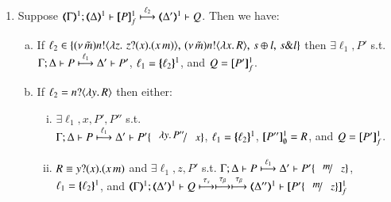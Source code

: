 \documentclass[runningheads]{llncs}
\begin{document}
{\begin{proposition}
\begin{enumerate}[1.]
		\item	Suppose $\horel{\tmap{\Gamma}{1}}{\tmap{\Delta}{1}}{\pmapp{P}{1}{f}}{\hby{\ell_2}}{\tmap{\Delta'}{1}}{Q}$.
			Then we have:
%
			\begin{enumerate}[a)]
				\item 
					If $\ell_2 \in
					\{(\nu\, \tilde{m})n ! \langle \lambda z.\,\,z ? (x) . (x\, {m}) \rangle, \,(\nu\, \tilde{m}) n ! \langle \lambda x.\,R \rangle, \,s \oplus l, \,s \& l\}$
					then $\exists \ell_1, P'$ s.t. \\
					$\Gamma; \Delta \vdash P \stackrel{\ell_1}{\longmapsto} \Delta' \vdash P'$, 
					$\ell_1 = \{\!\!\{\ell_2\}\!\!\}^{1}$, 
					and
					$Q = [\!\![P']\!\!]^1_f$.
			
				\item 
					If $\ell_2 = n ? \langle \lambda y.\,R \rangle$ %
					then either:
%
					\begin{enumerate}[(i)]
						\item	$\exists \ell_1, x, P', P''$ s.t. \\
							$\horel{\Gamma}{\Delta}{P}{\hby{\ell_1}}{\Delta'}{P' \subst{\abs{y}P''}{x}}$, 
							$\ell_1 = \{\!\!\{\ell_2\}\!\!\}^{1}$, $[\!\![P'']\!\!]^1_\emptyset = R$, and $Q = [\!\![P']\!\!]^1_f$.

						\item	$R \equiv y ? (x) . (x\, {m})$ and 
							$\exists \ell_1, z, P'$ s.t. 
							$\horel{\Gamma}{\Delta}{P}{\hby{\ell_1}}{\Delta'}{P' \subst{m}{z}}$, \\
							$\ell_1 = \{\!\!\{\ell_2\}\!\!\}^{1}$,
							and 
							$\horel{\tmap{\Gamma}{1}}{\tmap{\Delta'}{1}}{Q}{\hby{\stau} \hby{\btau} \hby{\btau}}{\tmap{\Delta''}{1}}{\pmapp{P'\subst{m}{z}}{1}{f}}$
					\end{enumerate}
			
%
%
		    \end{enumerate}
		    

\end{enumerate}
\end{proposition}}
\end{document}
